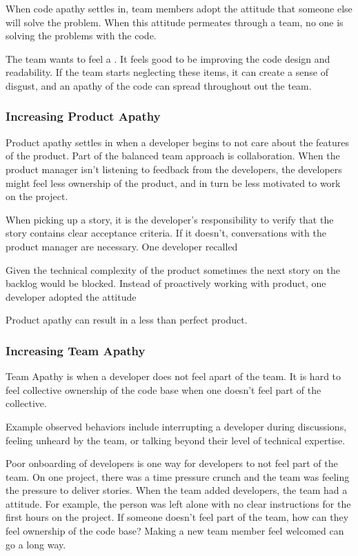 When code apathy settles in, team members adopt the attitude that someone else will solve the problem. When this attitude permeates through a team, no one is solving the problems with the code. 

The team wants to feel a .  It feels good to be improving the code design and readability. If the team starts neglecting these items, it can create a sense of disgust, and an apathy of the code can spread throughout out the team.

\subsubsection{Increasing Product Apathy}
Product apathy settles in when a developer begins to not care about the features of the product. Part of the balanced team approach is collaboration. When the product manager isn't listening to feedback from the developers, the developers might feel less ownership of the product, and in turn be less motivated to work on the project.

When picking up a story, it is the developer's responsibility to verify that the story contains clear acceptance criteria. If it doesn't, conversations with the product manager are necessary. One developer recalled  

Given the technical complexity of the product sometimes the next story on the backlog would be blocked. Instead of proactively working with product, one developer adopted the attitude  

Product apathy can result in a less than perfect product.


\subsubsection{Increasing Team Apathy}
Team Apathy is when a developer does not feel apart of the team. It is hard to feel collective ownership of the code base when one doesn't feel part of the collective.

Example observed behaviors include interrupting a developer during discussions, feeling unheard by the team, or talking beyond their level of technical expertise. 

Poor onboarding of developers is one way for developers to not feel part of the team. On one project, there was a time pressure crunch and the team was feeling the pressure to deliver stories. When the team added developers, the team had a  attitude. For example, the person was left alone with no clear instructions for the first hours on the project. If someone doesn't feel part of the team, how can they feel ownership of the code base? Making a new team member feel welcomed can go a long way.

